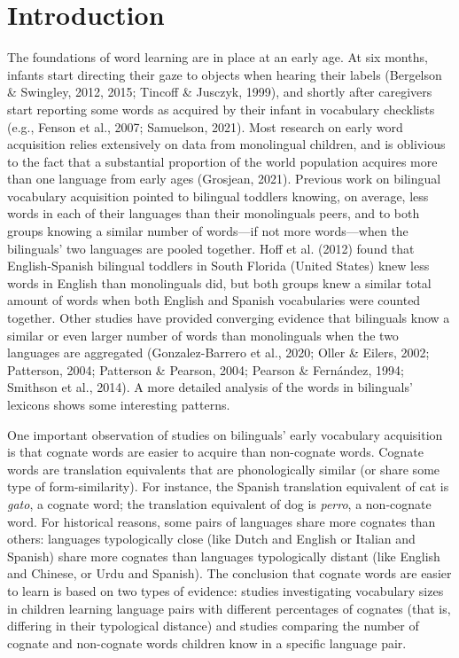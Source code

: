 \documentclass[
  12pt,
  b5paperpaper,
  twoside]{scrreprt}
\begin{document}
\hypertarget{introduction}{%
\section{Introduction}\label{introduction}}

The foundations of word learning are in place at an early age. At six
months, infants start directing their gaze to objects when hearing their
labels (Bergelson \& Swingley, 2012, 2015; Tincoff \& Jusczyk, 1999),
and shortly after caregivers start reporting some words as acquired by
their infant in vocabulary checklists (e.g., Fenson et al., 2007;
Samuelson, 2021). Most research on early word acquisition relies
extensively on data from monolingual children, and is oblivious to the
fact that a substantial proportion of the world population acquires more
than one language from early ages (Grosjean, 2021). Previous work on
bilingual vocabulary acquisition pointed to bilingual toddlers knowing,
on average, less words in each of their languages than their
monolinguals peers, and to both groups knowing a similar number of
words---if not more words---when the bilinguals' two languages are
pooled together. Hoff et al. (2012) found that English-Spanish bilingual
toddlers in South Florida (United States) knew less words in English
than monolinguals did, but both groups knew a similar total amount of
words when both English and Spanish vocabularies were counted together.
Other studies have provided converging evidence that bilinguals know a
similar or even larger number of words than monolinguals when the two
languages are aggregated (Gonzalez-Barrero et al., 2020; Oller \&
Eilers, 2002; Patterson, 2004; Patterson \& Pearson, 2004; Pearson \&
Fernández, 1994; Smithson et al., 2014). A more detailed analysis of the
words in bilinguals' lexicons shows some interesting patterns.

One important observation of studies on bilinguals' early vocabulary
acquisition is that cognate words are easier to acquire than non-cognate
words. Cognate words are translation equivalents that are phonologically
similar (or share some type of form-similarity). For instance, the
Spanish translation equivalent of cat is \emph{gato}, a cognate word;
the translation equivalent of dog is \emph{perro}, a non-cognate word.
For historical reasons, some pairs of languages share more cognates than
others: languages typologically close (like Dutch and English or Italian
and Spanish) share more cognates than languages typologically distant
(like English and Chinese, or Urdu and Spanish). The conclusion that
cognate words are easier to learn is based on two types of evidence:
studies investigating vocabulary sizes in children learning language
pairs with different percentages of cognates (that is, differing in
their typological distance) and studies comparing the number of cognate
and non-cognate words children know in a specific language pair.
\end{document}
